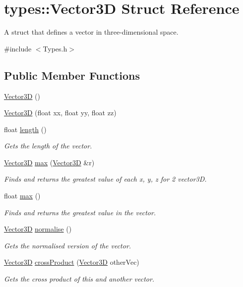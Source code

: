 \hypertarget{structtypes_1_1_vector3_d}{}\section{types\+:\+:Vector3\+D Struct Reference}
\label{structtypes_1_1_vector3_d}


A struct that defines a vector in three-\/dimensional space.  




{\ttfamily \#include $<$Types.\+h$>$}

\subsection*{Public Member Functions}
\begin{DoxyCompactItemize}
\item 
\hyperlink{structtypes_1_1_vector3_d_a72a49411a6d9096033e8cfca88849ffe}{Vector3\+D} ()
\item 
\hyperlink{structtypes_1_1_vector3_d_acd44a5a9d994d2b1b6afcb4a5cbf0564}{Vector3\+D} (float xx, float yy, float zz)
\item 
float \hyperlink{structtypes_1_1_vector3_d_a65bef5482d7d9c99a6e5b0f4bde68b08}{length} ()
\begin{DoxyCompactList}\small\item\em Gets the length of the vector. \end{DoxyCompactList}\item 
\hyperlink{structtypes_1_1_vector3_d}{Vector3\+D} \hyperlink{structtypes_1_1_vector3_d_a2b569562e292dc7adf46098eab172a5a}{max} (\hyperlink{structtypes_1_1_vector3_d}{Vector3\+D} \&r)
\begin{DoxyCompactList}\small\item\em Finds and returns the greatest value of each x, y, z for 2 vector3\+D. \end{DoxyCompactList}\item 
float \hyperlink{structtypes_1_1_vector3_d_a900618219749e0f2a50a860db6295132}{max} ()
\begin{DoxyCompactList}\small\item\em Finds and returns the greatest value in the vector. \end{DoxyCompactList}\item 
\hyperlink{structtypes_1_1_vector3_d}{Vector3\+D} \hyperlink{structtypes_1_1_vector3_d_a07a09dd9e0a5700b376b15d7f9f6e89c}{normalise} ()
\begin{DoxyCompactList}\small\item\em Gets the normalised version of the vector. \end{DoxyCompactList}\item 
\hyperlink{structtypes_1_1_vector3_d}{Vector3\+D} \hyperlink{structtypes_1_1_vector3_d_ada2f1a89cf1f5eddc1c6a8ff05d7d98f}{cross\+Product} (\hyperlink{structtypes_1_1_vector3_d}{Vector3\+D} other\+Vec)
\begin{DoxyCompactList}\small\item\em Gets the cross product of this and another vector. \end{DoxyCompactList}\end{DoxyCompactItemize}
